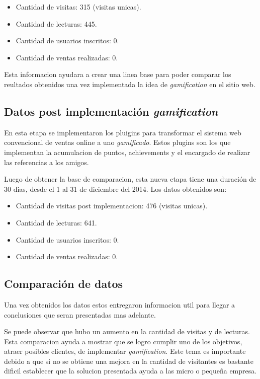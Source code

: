 \begin{itemize}
\item Cantidad de visitas: 315 (visitas unicas).
\item Cantidad de lecturas: 445.
\item Cantidad de usuarios inscritos: 0.
\item Cantidad de ventas realizadas: 0.
\end{itemize}

Esta informacion ayudara a crear una linea base para poder comparar los reultados obtenidos una vez
implementada la idea de \emph{gamification} en el sitio web. 

\subsection{Datos post implementación \emph{gamification}}

En esta etapa se implementaron los pluigins para transformar el sistema web convencional de ventas
online a uno \emph{gamificado}. Estos plugins son los que implementan la acumulacion de puntos, 
achievements y el encargado de realizar las referencias a los amigos.

Luego de obtener la base de comparacion, esta nueva etapa tiene una duración de 30 dias, desde 
el 1 al 31 de diciembre del 2014. Los datos obtenidos son:

\begin{itemize}
\item Cantidad de visitas post implementacion: 476 (visitas unicas).
\item Cantidad de lecturas: 641.
\item Cantidad de usuarios inscritos: 0.
\item Cantidad de ventas realizadas: 0.
\end{itemize}

\subsection{Comparación de datos}

Una vez obtenidos los datos estos entregaron informacion util para llegar a conclusiones que seran 
presentadas mas adelante. 

Se puede observar que hubo un aumento en la cantidad de visitas y de lecturas. Esta comparacion 
ayuda a mostrar que se logro cumplir uno de los objetivos, atraer posibles clientes, de implementar
 \emph{gamification}. Este tema es importante debido a que si no se obtiene una mejora en la cantidad
de visitantes es bastante dificil establecer que la solucion presentada ayuda a las micro o pequeña
empresa.

